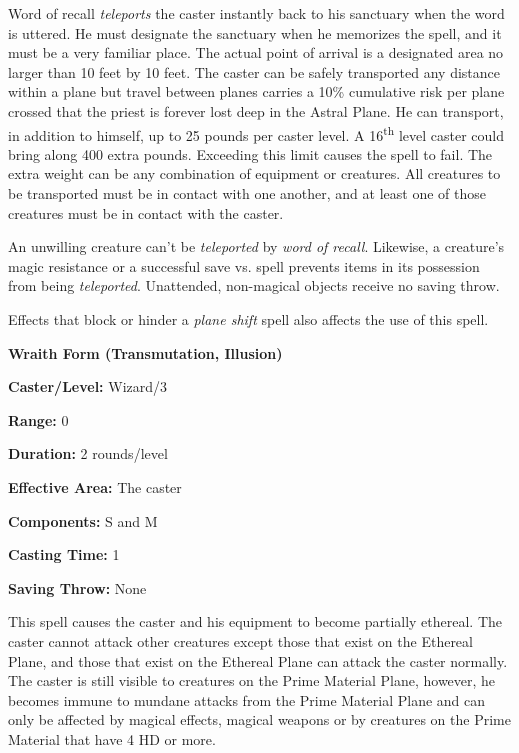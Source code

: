 \begin{multicols}{2}
Word of recall \textit{teleports} the caster instantly back to his sanctuary when the word is uttered.  He must designate the sanctuary when he memorizes the spell, and it must be a very familiar place.  The actual point of arrival is a designated area no larger than 10 feet by 10 feet.  The caster can be safely transported any distance within a plane but travel between planes carries a 10\% cumulative risk per plane crossed that the priest is forever lost deep in the Astral Plane.  He can transport, in addition to himself, up to 25 pounds per caster level.  A 16\textsuperscript{th} level caster could bring along 400 extra pounds.  Exceeding this limit causes the spell to fail.  The extra weight can be any combination of equipment or creatures.  All creatures to be transported must be in contact with one another, and at least one of those creatures must be in contact with the caster. 

An unwilling creature can't be \textit{teleported} by \textit{word of recall}.  Likewise, a creature's magic resistance or a successful save vs. spell prevents items in its possession from being \textit{teleported}.  Unattended, non-magical objects receive no saving throw.

Effects that block or hinder a \textit{plane shift} spell also affects the use of this spell.

\vspace{1em}

\noindent
\begin{minipage}{\columnwidth}

\noindent \textbf{Wraith Form (Transmutation, Illusion)}

\noindent \textbf{Caster/Level:} Wizard/3

\noindent \textbf{Range:} 0

\noindent \textbf{Duration:} 2 rounds/level

\noindent \textbf{Effective Area:} The caster

\noindent \textbf{Components:} S and M

\noindent \textbf{Casting Time:} 1

\noindent \textbf{Saving Throw:} None

\end{minipage}

This spell causes the caster and his equipment to become partially ethereal.  The caster cannot attack other creatures except those that exist on the Ethereal Plane, and those that exist on the Ethereal Plane can attack the caster normally.  The caster is still visible to creatures on the Prime Material Plane, however, he becomes immune to mundane attacks from the Prime Material Plane and can only be affected by magical effects, magical weapons or by creatures on the Prime Material that have 4 HD or more.  


\end{multicols}
